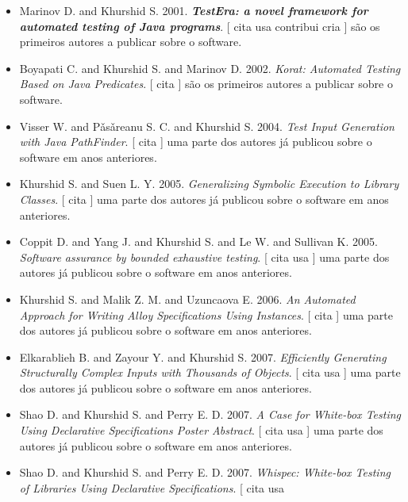 \begin{itemize}
\item Marinov D. and Khurshid S.
      2001.
        \textbf{\textit{ TestEra: a novel framework for automated testing of Java programs}}.
      [
          cita
          usa
          contribui
          cria
      ]
são os primeiros autores a publicar sobre o software.
\item Boyapati C. and Khurshid S. and Marinov D.
      2002.
        \textit{ Korat: Automated Testing Based on Java Predicates}.
      [
          cita
      ]
são os primeiros autores a publicar sobre o software.
\item Visser W. and P\v{a}s\v{a}reanu S. C. and Khurshid S.
      2004.
        \textit{ Test Input Generation with Java PathFinder}.
      [
          cita
      ]
uma parte dos autores já publicou sobre o software em anos anteriores.
\item Khurshid S. and Suen L. Y.
      2005.
        \textit{ Generalizing Symbolic Execution to Library Classes}.
      [
          cita
      ]
uma parte dos autores já publicou sobre o software em anos anteriores.
\item Coppit D. and Yang J. and Khurshid S. and Le W. and Sullivan K.
      2005.
        \textit{ Software assurance by bounded exhaustive testing}.
      [
          cita
          usa
      ]
uma parte dos autores já publicou sobre o software em anos anteriores.
\item Khurshid S. and Malik Z. M. and Uzuncaova E.
      2006.
        \textit{ An Automated Approach for Writing Alloy Specifications Using Instances}.
      [
          cita
      ]
uma parte dos autores já publicou sobre o software em anos anteriores.
\item Elkarablieh B. and Zayour Y. and Khurshid S.
      2007.
        \textit{ Efficiently Generating Structurally Complex Inputs with Thousands of Objects}.
      [
          cita
          usa
      ]
uma parte dos autores já publicou sobre o software em anos anteriores.
\item Shao D. and Khurshid S. and Perry E. D.
      2007.
        \textit{ A Case for White-box Testing Using Declarative Specifications Poster Abstract}.
      [
          cita
          usa
      ]
uma parte dos autores já publicou sobre o software em anos anteriores.
\item Shao D. and Khurshid S. and Perry E. D.
      2007.
        \textit{ Whispec: White-box Testing of Libraries Using Declarative Specifications}.
      [
          cita
          usa

\end{itemize}
